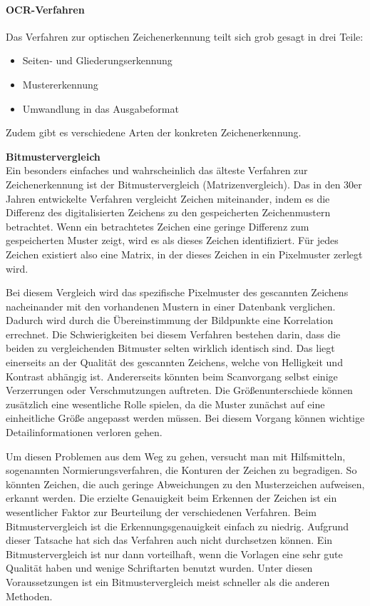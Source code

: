 \paragraph{OCR-Verfahren}
Das Verfahren zur optischen Zeichenerkennung teilt sich grob gesagt in drei Teile:
\begin{itemize}
\item Seiten- und Gliederungserkennung
\item Mustererkennung
\item Umwandlung in das Ausgabeformat
\end{itemize}
Zudem gibt es verschiedene Arten der konkreten Zeichenerkennung. \cite{OCRB}

\textbf{Bitmustervergleich}\\
Ein besonders einfaches und wahrscheinlich das älteste Verfahren zur Zeichenerkennung ist der Bitmustervergleich (Matrizenvergleich). Das in den 30er Jahren entwickelte Verfahren vergleicht Zeichen miteinander, indem es die Differenz des digitalisierten Zeichens zu den gespeicherten Zeichenmustern betrachtet. Wenn ein betrachtetes Zeichen eine geringe Differenz zum gespeicherten Muster zeigt, wird es als dieses Zeichen identifiziert. Für jedes Zeichen existiert also eine Matrix, in der dieses Zeichen in ein Pixelmuster zerlegt wird. \cite{OCRB}


Bei diesem Vergleich wird das spezifische Pixelmuster des gescannten Zeichens nacheinander mit den vorhandenen Mustern in einer Datenbank verglichen. Dadurch wird durch die Übereinstimmung der Bildpunkte eine Korrelation errechnet. Die Schwierigkeiten bei diesem Verfahren bestehen darin, dass die beiden zu vergleichenden Bitmuster selten wirklich identisch sind. Das liegt einerseits an der Qualität des gescannten Zeichens, welche von Helligkeit und Kontrast abhängig ist. Andererseits könnten beim Scanvorgang selbst einige Verzerrungen oder Verschmutzungen auftreten. Die Größenunterschiede können zusätzlich eine wesentliche Rolle spielen, da die Muster zunächst auf eine einheitliche Größe angepasst werden müssen. Bei diesem Vorgang können wichtige Detailinformationen verloren gehen. \cite{OCRB}

Um diesen Problemen aus dem Weg zu gehen, versucht man mit Hilfsmitteln, sogenannten Normierungsverfahren, die Konturen der Zeichen zu begradigen. So könnten Zeichen, die auch geringe Abweichungen zu den Musterzeichen aufweisen, erkannt werden. Die erzielte Genauigkeit beim Erkennen der Zeichen ist ein wesentlicher Faktor zur Beurteilung der verschiedenen Verfahren. Beim Bitmustervergleich ist die Erkennungsgenauigkeit einfach zu niedrig. Aufgrund dieser Tatsache hat sich das Verfahren auch nicht durchsetzen können. Ein Bitmustervergleich ist nur dann vorteilhaft, wenn die Vorlagen eine sehr gute Qualität haben und wenige Schriftarten benutzt wurden. Unter diesen Voraussetzungen ist ein Bitmustervergleich meist schneller als die anderen Methoden. \cite{OCRB,OCRP}

